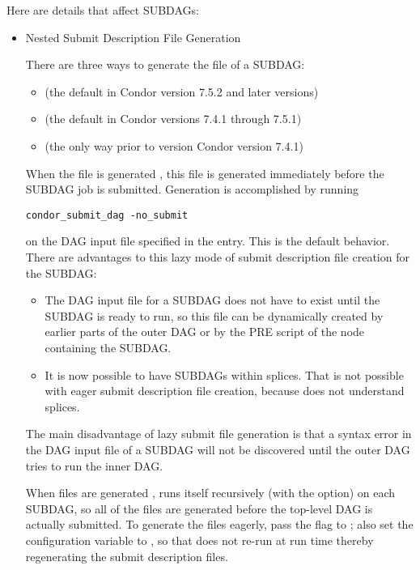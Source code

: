 Here are details that affect SUBDAGs:
\begin{itemize}
\item{Nested Submit Description File Generation}

There are three ways to generate the  file
of a SUBDAG:

\begin{itemize}
\item {} (the default in Condor version 7.5.2 and later versions)
\item {} (the default in Condor versions 7.4.1 through 7.5.1)
\item {} (the only way prior to version Condor version 7.4.1)
\end{itemize}

When the  file is generated ,
this file is generated immediately
before the SUBDAG job is submitted.
Generation is accomplished by running
\begin{verbatim}
condor_submit_dag -no_submit
\end{verbatim}
on the DAG input file specified in the  entry.
This is the default behavior.
There are advantages to this lazy mode of submit description
file creation for the SUBDAG:
\begin{itemize}
\item The DAG input file for a SUBDAG does not have to exist until the SUBDAG
is ready to run, so this file can be dynamically created by earlier
parts of the outer DAG or by the PRE script of the node containing the SUBDAG.
\item It is now possible to have SUBDAGs within splices. 
That is not
possible with eager submit description file creation,
because  does not understand splices.
\end{itemize}

The main disadvantage of lazy submit file generation is that 
a syntax error in the DAG input file of a SUBDAG will not be discovered
until the outer DAG tries to run the inner DAG.

When  files are generated ,
 runs itself recursively (with the 
option) on each SUBDAG, so all of the  files
are generated before the top-level DAG is actually submitted.
To generate the  files eagerly, 
pass the  flag to ; 
also set the  configuration variable
to , so that  does not re-run
 at run time thereby regenerating 
the submit description files.


\end{itemize}
